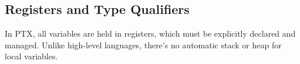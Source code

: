 \subsection{Registers and Type Qualifiers}

In PTX, all variables are held in registers, which must be explicitly declared and managed. Unlike high-level languages, there's no automatic stack or heap for local variables.

